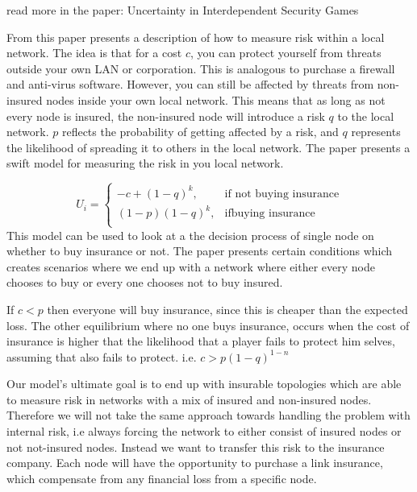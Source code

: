 read more in the paper: Uncertainty in Interdependent Security Games

From this paper presents a description of how to measure risk within a local network. The idea is that for a cost $c$, you can protect yourself from threats outside your own LAN or corporation. This is analogous to purchase a firewall and anti-virus software. However, you can still be affected by threats from non-insured nodes inside your own local network. This means that as long as not every node is insured, the non-insured node will introduce a risk $q$ to the local network. $p$ reflects the probability of getting affected by a risk, and $q$ represents the likelihood of spreading it to others in the local network. The paper presents a swift model for measuring the risk in you local network.

\begin{equation}
    U_{i}= 
\begin{cases}
    -c + (1-q)^k ,& \text{if not buying insurance} \\
   (1-p)(1-q)^k,& \text{ifbuying insurance }  \\
    
    
\end{cases}
\label{eq:riskModel}
\end{equation}
 This model can be used to look at a the decision process of single node on whether to buy insurance or not. The paper presents certain conditions which creates scenarios where we end up with a network where either every node chooses to buy or every one chooses not to buy insured. 

If $c<p$ then everyone will buy insurance, since this is cheaper than the expected loss. The other equilibrium where no one buys insurance, occurs when the cost of insurance is higher that the likelihood that a player fails to protect him selves, assuming that also fails to protect. i.e. $c>p(1-q)^{1-n}$
 
Our model's ultimate goal is to end up with insurable topologies which are able to measure risk in networks with a mix of insured and non-insured nodes. Therefore we will not take the same approach towards handling the problem with internal risk, i.e always forcing the network to either consist of insured nodes or not not-insured nodes. Instead we want to transfer this risk to the insurance company. Each node will have the opportunity to purchase a link insurance, which compensate from any financial loss from a specific node. 